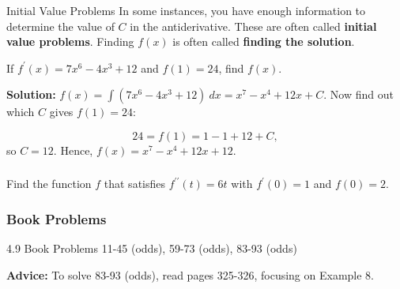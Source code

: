 \documentclass[cal1spr16Lectures.tex]{subfiles}
\begin{document}
\begin{frame}{\small Initial Value Problems}\footnotesize
In some instances, you have enough information to determine the value of $C$ in the antiderivative.  These are often called {\bf initial value problems}.  Finding $f(x)$ is often called {\bf finding the solution}.

\begin{ex} 
If $f^{\prime}(x)=7x^6-4x^3+12$ and $f(1)=24$, find $f(x)$. 
\end{ex} 
{\bf Solution:}  $f(x)=\int (7x^6-4x^3+12)\ dx = x^7 - x^4 + 12x + C$.  Now find out which $C$ gives $f(1)=24$:

\vspace{-0.5pc}
\[24=f(1)=1-1+12+C,\] 
so $C=12$.  Hence, \alert{$f(x)=x^7 - x^4 + 12x + 12$}.
\end{frame}

\begin{frame}%
\frametitle{}
\begin{exe} Find the function $f$ that satisfies $f^{\prime\prime}(t)=6t$ with $f^{\prime}(0)=1$ and $f(0)=2$. \end{exe}
\end{frame}

\subsubsection{Book Problems}

\begin{frame}
\begin{block}{4.9 Book Problems}
11-45 (odds), 59-73 (odds), 83-93 (odds) 
\end{block}
{\bf Advice:} To solve 83-93 (odds), read pages 325-326, focusing on Example 8. 
\end{frame}
\end{document}
